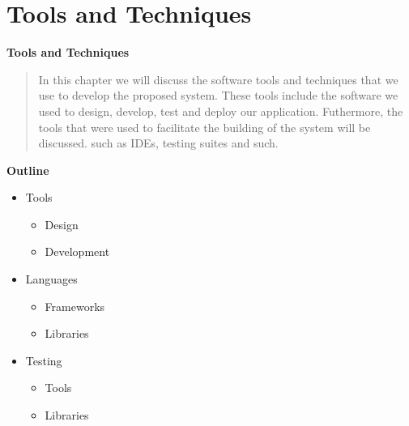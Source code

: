
\section{Tools and Techniques}


\vspace{20mm}

\Huge{\textbf{Tools and Techniques}}

\vspace{20mm}




\begin{abstract}
    In this chapter we will discuss the software tools and techniques that we use to develop the proposed system. These tools include the software we used to design, develop, test and deploy our application. Futhermore, the tools that were used to facilitate the building of the system will be discussed. such as IDEs, testing suites and such.

\end{abstract}

\vspace{20mm}

\large{\textbf{Outline}}

\begin{center}
    \begin{itemize}
        \item Tools
              \begin{itemize}
                  \item Design
                  \item Development
              \end{itemize}
        \item Languages
              \begin{itemize}
                  \item Frameworks
                  \item Libraries
              \end{itemize}
        \item Testing
              \begin{itemize}
                  \item Tools
                  \item Libraries
              \end{itemize}

    \end{itemize}
\end{center}
\pagebreak







